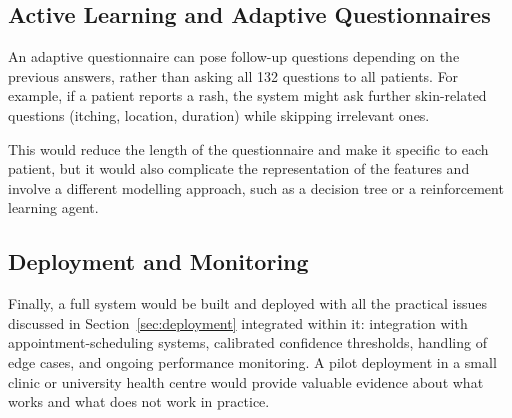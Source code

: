 \subsection{Active Learning and Adaptive Questionnaires}

An adaptive questionnaire can pose follow-up questions depending on the previous answers, rather than asking all 132 questions to all patients. For example, if a patient reports a rash, the system might ask further skin-related questions (itching, location, duration) while skipping irrelevant ones.

This would reduce the length of the questionnaire and make it specific to each patient, but it would also complicate the representation of the features and involve a different modelling approach, such as a decision tree or a reinforcement learning agent.

\subsection{Deployment and Monitoring}

Finally, a full system would be built and deployed with all the practical issues discussed in Section~\ref{sec:deployment} integrated within it: integration with appointment-scheduling systems, calibrated confidence thresholds, handling of edge cases, and ongoing performance monitoring. A pilot deployment in a small clinic or university health centre would provide valuable evidence about what works and what does not work in practice.